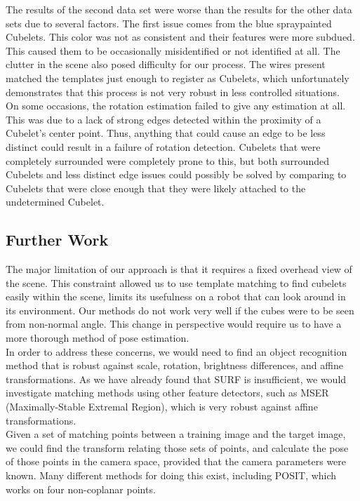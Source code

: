 \documentclass[conference]{IEEEtran}
\begin{document}
The results of the second data set were worse than the results for the other data sets due to several factors.  The first issue comes from the blue spraypainted Cubelets. This color was not as consistent and their features were more subdued. This caused them to be occasionally misidentified or not identified at all.  The clutter in the scene also posed difficulty for our process.  The wires present matched the templates just enough to register as Cubelets, which unfortunately demonstrates that this process is not very robust in less controlled situations.\\

On some occasions, the rotation estimation failed to give any estimation at all.  This was due to a lack of strong edges detected within the proximity of a Cubelet's center point.  Thus, anything that could cause an edge to be less distinct could result in a failure of rotation detection.  Cubelets that were completely surrounded were completely prone to this, but both surrounded Cubelets and less distinct edge issues could possibly be solved by comparing to Cubelets that were close enough that they were likely attached to the undetermined Cubelet.

\subsection{Further Work}
The major limitation of our approach is that it requires a fixed overhead view of the scene.  This constraint allowed us to use template matching to find cubelets easily within the scene, limits its usefulness on a robot that can look around in its environment.  Our methods do not work very well if the cubes were to be seen from non-normal angle.  This change in perspective would require us to have a more thorough method of pose estimation.  \\

In order to address these concerns, we would need to find an object recognition method that is robust against scale, rotation, brightness differences, and affine transformations.  As we have already found that SURF is insufficient, we would investigate matching methods using other feature detectors, such as MSER (Maximally-Stable Extremal Region), which is very robust against affine transformations.\\

Given a set of matching points between a training image and the target image, we could find the transform relating those sets of points, and calculate the pose of those points in the camera space, provided that the camera parameters were known.  Many different methods for doing this exist, including POSIT, which works on four non-coplanar points.
\end{document}
